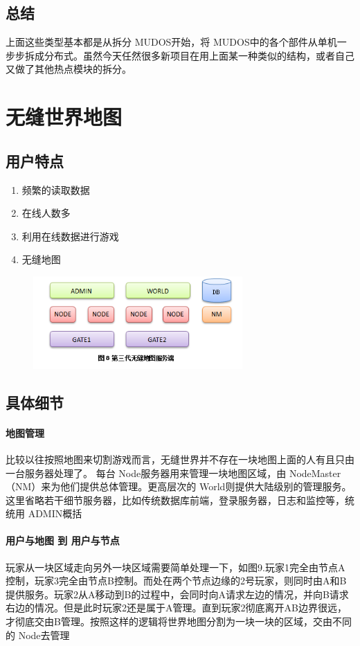 \documentclass[UTF8,a4paper,8pt]{ctexart}
\begin{document}
		\subsection{总结}上面这些类型基本都是从拆分 MUDOS开始，将 MUDOS中的各个部件从单机一步步拆成分布式。虽然今天任然很多新项目在用上面某一种类似的结构，或者自己又做了其他热点模块的拆分。
\newpage
\section{无缝世界地图}
		\subsection{用户特点}
			\begin{enumerate}[fullwidth,itemindent = 2em]
				\item  频繁的读取数据
				\item  在线人数多
				\item  利用在线数据进行游戏
				\item  无缝地图
			\end{enumerate}
			
			\begin{figure}[h] 	
				\centering
				\includegraphics[width=8cm,clip]{gameServer8.png} 	
				\label{fig:gameServer8}
			\end{figure} 
		\subsection{具体细节}	
			\paragraph{地图管理}比较以往按照地图来切割游戏而言，无缝世界并不存在一块地图上面的人有且只由一台服务器处理了。
			每台 Node服务器用来管理一块地图区域，由 NodeMaster（NM）来为他们提供总体管理。更高层次的 World则提供大陆级别的管理服务。这里省略若干细节服务器，比如传统数据库前端，登录服务器，日志和监控等，统统用 ADMIN概括
			
			\paragraph{用户与地图 到 用户与节点}玩家从一块区域走向另外一块区域需要简单处理一下，如图9.玩家1完全由节点A控制，玩家3完全由节点B控制。而处在两个节点边缘的2号玩家，则同时由A和B提供服务。玩家2从A移动到B的过程中，会同时向A请求左边的情况，并向B请求右边的情况。但是此时玩家2还是属于A管理。直到玩家2彻底离开AB边界很远，才彻底交由B管理。按照这样的逻辑将世界地图分割为一块一块的区域，交由不同的 Node去管理
			
\end{document}
